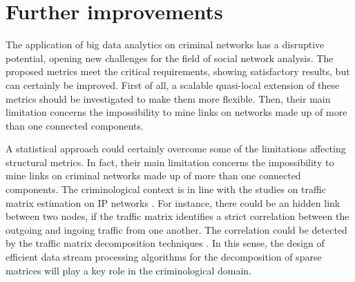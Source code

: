 \section{Further improvements}
\label{sec:further-improvements}

The application of big data analytics on criminal networks has a disruptive potential, opening new challenges for the field of social network analysis.
The proposed metrics meet the critical requirements, showing satisfactory results, but can certainly be improved. 
First of all, a scalable quasi-local extension of these metrics should be investigated to make them more flexible.
Then, their main limitation concerns the impossibility to mine links on networks made up of more than one connected components. 

A statistical approach could certainly overcome some of the limitations affecting structural metrics. In fact, their main limitation concerns the impossibility to mine links on criminal networks made up of more than one connected components.  
The criminological context is in line with the studies on traffic matrix estimation on IP networks  \cite{medina2002traffic,benameur2004traffic,papagiannaki2004distributed}. 
For instance, there could be an hidden link between two nodes, if the traffic matrix identifies a strict correlation between the outgoing and ingoing traffic from one another. 
The correlation could be detected by the traffic matrix decomposition techniques \cite{elgamal2015analysis,jiang2015covariance}. 
In this sense, the design of efficient data stream processing algorithms for the decomposition of sparse matrices will play a key role in the criminological domain.